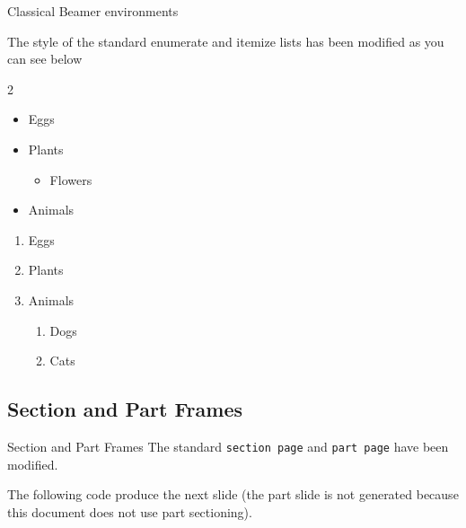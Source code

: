 \documentclass[10pt,aspectratio=169,english]{beamer}
\begin{document}
\begin{frame}{Classical Beamer environments}
\framebreak
{}

The style of the standard enumerate and itemize lists has been modified as you
can see below

\begin{multicols}{2}
  \begin{itemize}
\item Eggs
\item Plants
  \begin{itemize}
  \item Flowers
  \end{itemize}
\item Animals
\end{itemize}
\columnbreak
\begin{enumerate}
\item Eggs
\item Plants
\item Animals
  \begin{enumerate}
  \item Dogs
  \item Cats
  \end{enumerate}
\end{enumerate}
\end{multicols}
\end{frame}


\subsection{Section and Part Frames}

\newsavebox{\codebox}%
\begin{lrbox}{\codebox}
  \begin{Code}
\begin{frame}
\sectionpage
\end{frame}

\end{Code}
\end{lrbox}

\begin{frame}[fragile]{Section and Part Frames}\label{sectionpart}
  The standard \texttt{section page} and \texttt{part page} have been modified.

  The following code produce the next slide (the part slide is not generated
  because this document does not use part sectioning).

  \usebox{\codebox}

\end{frame}
\end{document}
